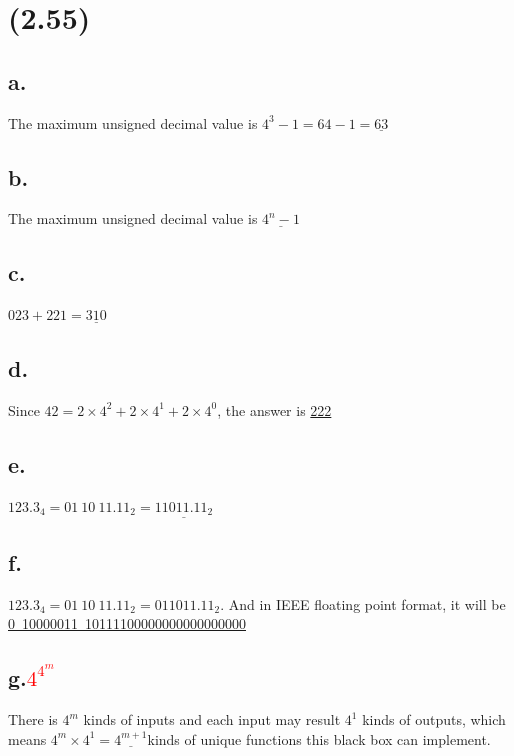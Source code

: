 \documentclass[11pt,a4paper]{article}
\begin{document}
	
	\section{(2.55)}
	\subsection*{a.}
	The maximum unsigned decimal value is $4^{3}-1=64-1=\underline{63}$
	\subsection*{b.}
	The maximum unsigned decimal value is $\underline{4^{n}-1}$
	\subsection*{c.}
	$023+221=\underline{310}$
	\subsection*{d.}
	Since $42 = 2\times 4^{2}+2\times 4^{1}+2\times 4^{0}$, the answer is \underline{222}
	\subsection*{e.}
	$123.3_{4}=01\ 10\ 11.11_{2}=\underline{11011.11_{2}}$
	\subsection*{f.}
	$123.3_{4}=01\ 10\ 11.11_{2}=011011.11_{2}$. And in IEEE floating point format, it will be \underline{0\ 10000011\ 10111100000000000000000}
	\subsection*{g.\textcolor{red}{$4^{4^{m}}$}}
	
	There is $4^{m}$ kinds of inputs and each input may result $4^{1}$ kinds of outputs, which means $4^{m}\times4^{1}=\underline{4^{m+1}}$kinds of unique functions this black box can implement.
	
	
\end{document}
